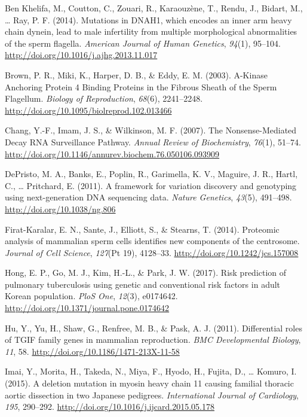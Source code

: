 \documentclass[12pt,twoside]{reedthesis}
\theoremstyle{definition}
\theoremstyle{definition}
\theoremstyle{remark}
\begin{document}
  \hypertarget{ref-BenKhelifa2014}{}
  Ben Khelifa, M., Coutton, C., Zouari, R., Karaouzène, T., Rendu, J.,
  Bidart, M., \ldots{} Ray, P. F. (2014). Mutations in DNAH1, which
  encodes an inner arm heavy chain dynein, lead to male infertility from
  multiple morphological abnormalities of the sperm flagella.
  \emph{American Journal of Human Genetics}, \emph{94}(1), 95--104.
  \url{http://doi.org/10.1016/j.ajhg.2013.11.017}
  
  \hypertarget{ref-Brown2003}{}
  Brown, P. R., Miki, K., Harper, D. B., \& Eddy, E. M. (2003). A-Kinase
  Anchoring Protein 4 Binding Proteins in the Fibrous Sheath of the Sperm
  Flagellum. \emph{Biology of Reproduction}, \emph{68}(6), 2241--2248.
  \url{http://doi.org/10.1095/biolreprod.102.013466}
  
  \hypertarget{ref-Chang2007}{}
  Chang, Y.-F., Imam, J. S., \& Wilkinson, M. F. (2007). The
  Nonsense-Mediated Decay RNA Surveillance Pathway. \emph{Annual Review of
  Biochemistry}, \emph{76}(1), 51--74.
  \url{http://doi.org/10.1146/annurev.biochem.76.050106.093909}
  
  \hypertarget{ref-DePristo2011}{}
  DePristo, M. A., Banks, E., Poplin, R., Garimella, K. V., Maguire, J.
  R., Hartl, C., \ldots{} Pritchard, E. (2011). A framework for variation
  discovery and genotyping using next-generation DNA sequencing data.
  \emph{Nature Genetics}, \emph{43}(5), 491--498.
  \url{http://doi.org/10.1038/ng.806}
  
  \hypertarget{ref-Firat-Karalar2014}{}
  Firat-Karalar, E. N., Sante, J., Elliott, S., \& Stearns, T. (2014).
  Proteomic analysis of mammalian sperm cells identifies new components of
  the centrosome. \emph{Journal of Cell Science}, \emph{127}(Pt 19),
  4128--33. \url{http://doi.org/10.1242/jcs.157008}
  
  \hypertarget{ref-Hong2017}{}
  Hong, E. P., Go, M. J., Kim, H.-L., \& Park, J. W. (2017). Risk
  prediction of pulmonary tuberculosis using genetic and conventional risk
  factors in adult Korean population. \emph{PloS One}, \emph{12}(3),
  e0174642. \url{http://doi.org/10.1371/journal.pone.0174642}
  
  \hypertarget{ref-Hu2011}{}
  Hu, Y., Yu, H., Shaw, G., Renfree, M. B., \& Pask, A. J. (2011).
  Differential roles of TGIF family genes in mammalian reproduction.
  \emph{BMC Developmental Biology}, \emph{11}, 58.
  \url{http://doi.org/10.1186/1471-213X-11-58}
  
  \hypertarget{ref-Imai2015}{}
  Imai, Y., Morita, H., Takeda, N., Miya, F., Hyodo, H., Fujita, D.,
  \ldots{} Komuro, I. (2015). A deletion mutation in myosin heavy chain 11
  causing familial thoracic aortic dissection in two Japanese pedigrees.
  \emph{International Journal of Cardiology}, \emph{195}, 290--292.
  \url{http://doi.org/10.1016/j.ijcard.2015.05.178}
  
\end{document}
